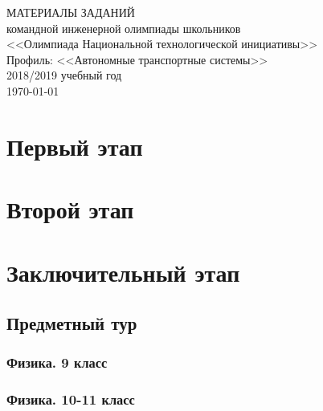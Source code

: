 \documentclass[a4paper,12pt,oneside]{book}
\begin{document}
\begin{titlepage}
    \begin{center}
        \huge{МАТЕРИАЛЫ ЗАДАНИЙ} \\
        \Large{командной инженерной олимпиады школьников} \\
        \Large{<<Олимпиада Национальной технологической инициативы>>} \\
        \Large{Профиль: <<Автономные транспортные системы>>} \\
        \large{2018/2019 учебный год} \\
        \vspace{2cm}
        \Large{\today}  
    \end{center}
\end{titlepage}

\setcounter{tocdepth}{1}

\tableofcontents

\part{Первый этап}




\part{Второй этап}



\part{Заключительный этап}

\clearpage
\chapter{Предметный тур}

\section{Физика. 9 класс}
%

\section{Физика. 10-11 класс}
%

%
%
\end{document}
